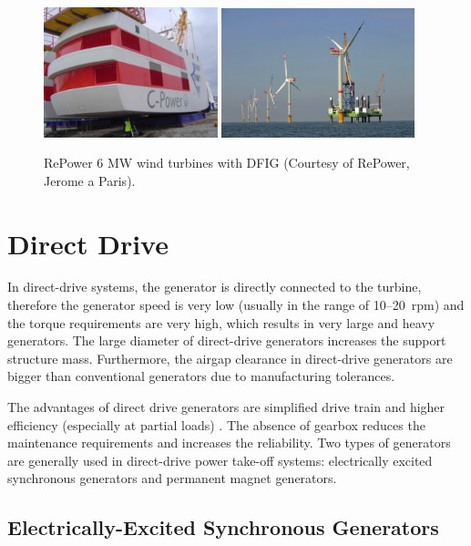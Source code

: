 \documentclass[a4paper, 11pt]{article} %
\begin{document}
\begin{figure}[]
  \centering
  \includegraphics[width=0.45\textwidth]{repower_nacelle}
  \hfill
    \includegraphics[width=0.5\textwidth]{repower_farm}
\caption{RePower 6 MW wind turbines with DFIG (Courtesy of RePower, Jerome a Paris).}
  \label{repower}
\end{figure}

\section{Direct Drive}

In direct-drive systems, the generator is directly connected to the turbine, therefore the generator speed is very low (usually in the range of 10--20~rpm) and the torque requirements are very high, which results in very large and heavy generators. The large diameter of direct-drive generators increases the support structure mass. Furthermore, the airgap clearance in direct-drive generators are bigger than conventional generators due to manufacturing tolerances.

The advantages of direct drive generators are simplified drive train and higher efficiency (especially at partial loads) \cite{Li2008a}. The absence of gearbox reduces the maintenance requirements and increases the reliability. Two types of generators are generally used in direct-drive power take-off systems: electrically excited synchronous generators and permanent magnet generators. 

\subsection{Electrically-Excited Synchronous Generators}
\end{document}
